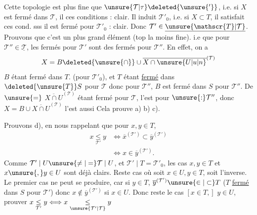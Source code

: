 Cette topologie est plus fine que $\unsure{\mathcal{T}|\tau}\deleted{\unsure{'}}$, i.e. si $X$ est fermé dans $\mathcal{T}$, il  ces conditions : clair. Il induit $\mathcal{T}'_0$, i.e. si $X\subset T$, il satisfait ces cond. sss il est fermé pour $\mathcal{T}'_0$ : clair. Donc $\mathcal{T}'\in\underline{\unsure{\mathscr{T}|\mathcal{T}}}$. Prouvons que c'est un plus grand élément (top la moins fine). i.e que pour  $\mathcal{T}''\in\underline{\mathcal{T}}$, les fermés pour $\mathcal{T}'$ sont des fermés pour $\mathcal{T}''$. En effet, on a
\[
X=B\deleted{\unsure{\cap}}\cup\overline{X\cap\unsure{U|u|n}}^{(\mathcal{T})}
\]
$B$ étant fermé dans $T$. (pour $\mathcal{T}'_0$), et $T$ étant \uline{fermé} dans $\deleted{\unsure{T}}S$ pour $\mathcal{T}$ donc  pour $\mathcal{T}''$, $B$ est fermé dans $S$ pour $\mathcal{T}''$.
De $\unsure{=}$ $\overline{X\cap U}^{(\mathcal{T})}$ étant fermé pour $\mathcal{T}$, l'est pour $\unsure{:}\mathcal{T}''$, donc $X=B\cup\overline{X\cap U}^{(\mathcal{T})}$ l'est aussi Cela prouve a) b) c).

Prouvons d), en nous rappelant que pour $x,y\in T$,
\[
\begin{aligned}
x\underset{\mathcal{T}'}{\leq}y&\Longleftrightarrow\overline{x}^{(\mathcal{T}')}\subset\overline{y}^{(\mathcal{T}')}\\
&\Longleftrightarrow x\in\overline{y}^{(\mathcal{T}')}.
\end{aligned}
\]
Comme $\mathcal{T}'\mid U\unsure{\ne|=}\mathcal{T}\mid U$, et $\mathcal{T}'\mid T=\mathcal{T}'_0$, les cas $x,y\in T$ et $x\unsure{,}y\in U$ sont déjà clairs. Reste  cas où soit $x\in U,y\in T$, soit l'inverse. Le premier cas ne peut se produire, car si $y\in T$, $\overline{y}^{(\mathcal{T}')}\unsure{\in|\subset}T$ ($T$ \uline{fermé} dans $S$ pour $\mathcal{T}'$) donc $x\notin\overline{y}^{(\mathcal{T}')}$  si $x\in U$. Donc reste le cas $[x\in T,]$ $y\in U$, prouver $x\underset{\mathcal{T}'}{\leq}y\Longleftrightarrow x\underset{\unsure{\mathcal{T}'|\mathcal{T}}}{\leq}y$
